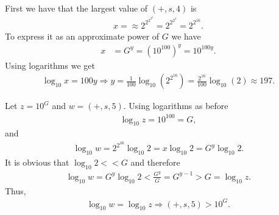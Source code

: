 \begin{questions}

\begin{solution}

\end{solution}
\begin{solution}

\end{solution}
\begin{solution}
First we have that the largest value of $(+,s,4)$ is
\begin{align*}
x=\approx 2^{2^{2^{2^2}}}=2^{2^{2^{4}}}=2^{2^{16}}.
\end{align*}
To express it as an approximate power of $G$ we have
\begin{align*}
x&=G^y=\left(10^{100}\right)^y=10^{100y}.
\end{align*}
Using logarithms we get
\begin{align*}
\log_{10}x=100y\Rightarrow
y=\frac{1}{100}\log_{10}\left(2^{2^{16}}\right)=\frac{2^{16}}{100}\log_{10}\left(2\right)\approx
197.
\end{align*}
\end{solution}
\begin{solution}
Let $z=10^G$ and $w=(+,s,5)$. Using logarithms as before
\begin{align*}
\log_{10}z=10^{100}=G,
\end{align*}
and
\begin{align*}
\log_{10}w=2^{2^{16}}\log_{10}2=x\log_{10}2=G^y\log_{10}2.
\end{align*}
It is obvious that $\log_{10}2<<G$ and therefore
\begin{align*}
\log_{10}w=G^y\log_{10}2<\frac{G^y}{G}=G^{y-1}>G=\log_{10}z.
\end{align*}
Thus,
\begin{align*}
\log_{10}w=\log_{10}z\Rightarrow (+,s,5)>10^G.
\end{align*}
\end{solution}
\begin{solution}

\end{solution}
\end{questions}
